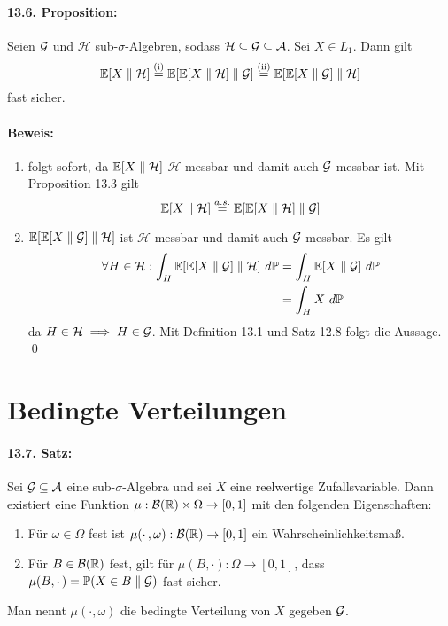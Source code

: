 \documentclass[11pt]{report}
\begin{document}
     \paragraph{13.6. Proposition:}Seien $\mathcal{G}$ und $\mathcal{H}$ sub-$\sigma$-Algebren, sodass $\mathcal{H}\subseteq\mathcal{G}\subseteq\mathcal{A}$. Sei $X\in L_1$. Dann gilt
     $$\mathbb{E}[X\parallel\mathcal{H}]\overset{\text{(i)}}{=}\mathbb{E}[\mathbb{E}[X\parallel\mathcal{H}]\parallel\mathcal{G}]\overset{\text{(ii)}}{=}\mathbb{E}[\mathbb{E}[X\parallel\mathcal{G}]\parallel\mathcal{H}]$$
     fast sicher.
     
     \paragraph{Beweis:}
     \begin{enumerate}[label=(\roman*)]
         \item folgt sofort, da $\mathbb{E}[X\parallel\mathcal{H}]$ $\mathcal{H}$-messbar und damit auch $\mathcal{G}$-messbar ist. Mit Proposition 13.3 gilt
         $$\mathbb{E}[X\parallel\mathcal{H}]\overset{a.s.}{=}\mathbb{E}[\mathbb{E}[X\parallel\mathcal{H}]\parallel\mathcal{G}]$$
         \item $\mathbb{E}[\mathbb{E}[X\parallel\mathcal{G}]\parallel\mathcal{H}]$ ist $\mathcal{H}$-messbar und damit auch $\mathcal{G}$-messbar. Es gilt
         \begin{align*}
             \forall H\in\mathcal{H}:\int_H\E[\E[X\parallel\G]\parallel\mathcal{H}]\ d\Pp&=\int_H\E[X\parallel\G]\ d\Pp\\
             &=\int_H X\ d\Pp
         \end{align*}
         da $H\in\mathcal{H}\implies H\in\mathcal{G}$. Mit Definition 13.1 und Satz 12.8 folgt die Aussage. \qed
    \end{enumerate}
    
    \section*{Bedingte Verteilungen}
    
    \paragraph{13.7. Satz:} Sei $\mathcal{G}\subseteq\mathcal{A}$ eine sub-$\sigma$-Algebra und sei $X$ eine reelwertige Zufallsvariable. Dann existiert eine Funktion $\mu:\mathcal{B}(\mathbb{R})\times\Omega\to[0,1]$ mit den folgenden Eigenschaften:
    \begin{enumerate}[label=(\roman*)]
        \item Für $\omega\in\Omega$ fest ist $\mu(\cdotp,\omega):\mathcal{B}(\mathbb{R})\to[0,1]$ ein Wahrscheinlichkeitsmaß.
        \item Für $B\in\mathcal{B}(\mathbb{R})$ fest, gilt für $\mu(B,\cdotp):\Omega\to[0,1]$, dass $\mu(B,\cdotp)=\mathbb{P}(X\in B\parallel\mathcal{G})$ fast sicher. 
    \end{enumerate} 
    Man nennt $\mu(\cdotp,\omega)$ die bedingte Verteilung von $X$ gegeben $\mathcal{G}$.
    
\end{document}

